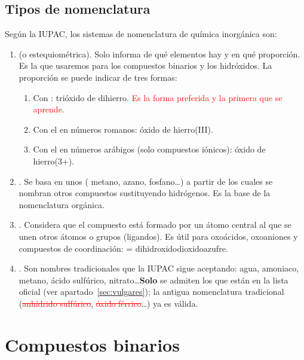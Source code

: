 \documentclass[12pt]{article}
\theoremstyle{mygreennumbox}
\newcommand{\mal}[1]{\textcolor{red}{\sout{#1}}}
\begin{document}
\subsection{Tipos de nomenclatura}

Según la IUPAC, los sistemas de nomenclatura de química inorgánica son:
\begin{enumerate}[label=\numberballblue]
    \item {} (o estequiométrica). Solo informa de qué elementos hay y en qué proporción. Es la que usaremos para los compuestos binarios y los hidróxidos. La proporción se puede indicar de tres formas:
          \begin{enumerate}[label=\itembolascolor{\arabic*}{blue}]
              \item Con :  trióxido de dihierro. \textcolor{red}{Es la forma preferida y la primera que se aprende.}
              \item Con el  en números romanos:  óxido de hierro(III).
              \item Con el  en números arábigos (solo compuestos iónicos):  óxido de hierro(3+).
          \end{enumerate}
    \item {}. Se basa en unos  ( metano,  azano,  fosfano\dots) a partir de los cuales se nombran otros compuestos sustituyendo hidrógenos. Es la base de la nomenclatura orgánica.
    \item {}. Considera que el compuesto está formado por un átomo central al que se unen otros átomos o grupos (ligandos). Es útil para oxoácidos, oxoaniones y compuestos de coordinación:  = \ch{[SO2(OH)2]} dihidroxidodioxidoazufre.
    \item {}. Son nombres tradicionales que la IUPAC sigue aceptando: agua, amoniaco, metano, ácido sulfúrico, nitrato\dots \textbf{Solo} se admiten los que están en la lista oficial (ver apartado~\ref{sec:vulgares}); la antigua nomenclatura tradicional (\mal{anhídrido sulfúrico}, \mal{óxido férrico}\dots) ya  es válida.
\end{enumerate}

\section{Compuestos binarios}\label{sec:binarios}
\end{document}
